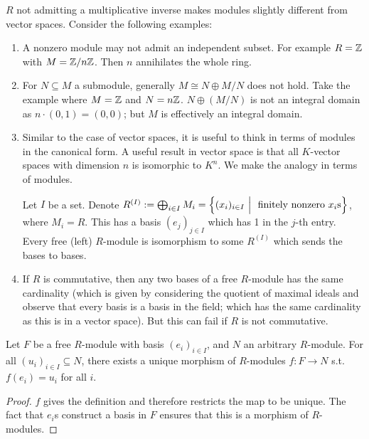 \documentclass{article}
\begin{document}
\begin{remark}\label{rmk:4.1}
    $R$ not admitting a multiplicative inverse makes modules slightly different from vector spaces. Consider the following examples:
    \begin{enumerate}
        \item A nonzero module may not admit an independent subset. For example $R=\mathbb{Z}$ with $M = \mathbb{Z}/n\mathbb{Z}$. Then $n$ annihilates the whole ring.
        \item For $N\subseteq M$ a submodule, generally $M \cong N \oplus M/N$ does not hold. Take the example where $M = \mathbb{Z}$ and $N = n\mathbb{Z}$. $N \oplus (M/N)$ is not an integral domain as $n\cdot(0, 1) = (0, 0)$; but $M$ is effectively an integral domain.
        \item Similar to the case of vector spaces, it is useful to think in terms of modules in the canonical form. A useful result in vector space is that all $K$-vector spaces with dimension $n$ is isomorphic to $K^n$. We make the analogy in terms of modules. 
        
        Let $I$ be a set. Denote $R^{(I)} := \bigoplus_{i\in I} M_i = \left\{ (x_i)_{i\in I} \ \Big|\  \text{ finitely nonzero }x_i\text{s} \right\}$, where $M_i = R$. This has a basis $(e_j)_{j\in I}$ which has 1 in the $j$-th entry. Every free (left) $R$-module is isomorphism to some $R^{(I)}$ which sends the bases to bases.
        \item If $R$ is commutative, then any two bases of a free $R$-module has the same cardinality (which is given by considering the quotient of maximal ideals and observe that every basis is a basis in the field; which has the same cardinality as this is in a vector space). But this can fail if $R$ is not commutative.
    \end{enumerate}
\end{remark}

\begin{theorem}\label{thm:Universal Property of Free Modules}
    Let $F$ be a free $R$-module with basis $(e_i)_{i\in I}$, and $N$ an arbitrary $R$-module. For all $(u_i)_{i\in I} \subseteq N$, there exists a unique morphism of $R$-modules $f: F\to N$ s.t. $f(e_i) = u_i$ for all $i$.
\end{theorem}

\begin{proof}
    $f$ gives the definition and therefore restricts the map to be unique. The fact that $e_i$s construct a basis in $F$ ensures that this is a morphism of $R$-modules. 
\end{proof}
\end{document}

